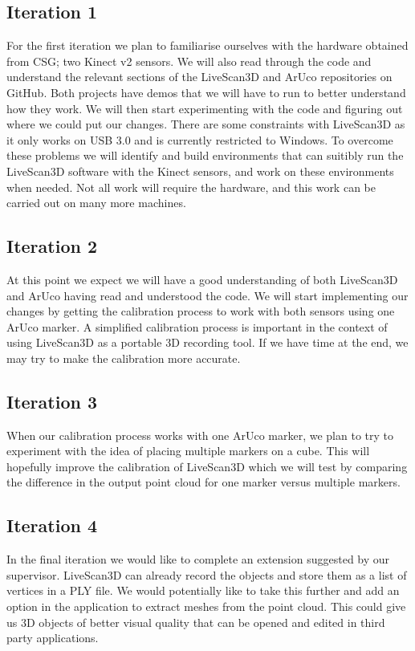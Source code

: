 \documentclass[a4paper,12pt]{report}
\begin{document}
\subsection*{Iteration 1}
For the first iteration we plan to familiarise ourselves with the hardware obtained from CSG; two Kinect v2 sensors. We will also read through the code and understand the relevant sections of the LiveScan3D and ArUco repositories on GitHub. Both projects have demos that we will have to run to better understand how they work. We will then start experimenting with the code and figuring out where we could put our changes.
There are some constraints with LiveScan3D as it only works on USB 3.0 and is currently restricted to Windows. To overcome these problems we will identify and build environments that can suitibly run the LiveScan3D software with the Kinect sensors, and work on these environments when needed. Not all work will require the hardware, and this work can be carried out on many more machines.
\\

\subsection*{Iteration 2}
\iffalse
The calibration process in LiveScan3D is currently a bit cumbersome. The idea is to use ArUco to simplify this, and also possibly make it more accurate. Yes, you can use multiple markers, maybe even arranged on 3D objects like cubes. We can discuss details on Wednesday. A simplified calibration process would be important in the context of using something like LiveScan3D as a portable 3D recording tool.
\fi
At this point we expect we will have a good understanding of both LiveScan3D and ArUco having read and understood the code. We will start implementing our changes by getting the calibration process to work with both sensors using one ArUco marker. A simplified calibration process is important in the context of using LiveScan3D as a portable 3D recording tool. If we have time at the end, we may try to make the calibration more accurate.  

\subsection*{Iteration 3}
When our calibration process works with one ArUco marker, we plan to try to experiment with the idea of placing multiple markers on a cube. This will hopefully improve the calibration of LiveScan3D which we will test by comparing the difference in the output point cloud for one marker versus multiple markers.

\subsection*{Iteration 4}
In the final iteration we would like to complete an extension suggested by our supervisor. LiveScan3D can already record the objects and store them as a list of vertices in a PLY file. We would potentially like to take this further and add an option in the application to extract meshes from the point cloud. This could give us 3D objects of better visual quality that can be opened and edited in third party applications. 
\end{document}
